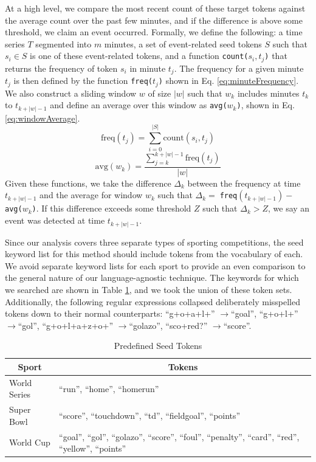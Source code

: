 \documentclass{sig-alternate}
\begin{document}
At a high level, we compare the most recent count of these target tokens against the average count over the past few minutes, and if the difference is above some threshold, we claim an event occurred.
Formally, we define the following: a time series $T$ segmented into $m$ minutes, a set of event-related seed tokens $S$ such that $s_i \in S$ is one of these event-related tokens, and a function \texttt{count($s_i, t_j$)} that returns the frequency of token $s_i$ in minute $t_j$.
The frequency for a given minute $t_j$ is then defined by the function \texttt{freq($t_j$)} shown in Eq. \ref{eq:minuteFrequency}.
We also construct a sliding window $w$ of size $|w|$ such that $w_k$ includes minutes $t_k$ to $t_{k+|w|-1}$ and define an average over this window as \texttt{avg($w_k$)}, shown in Eq. \ref{eq:windowAverage}.
%
\begin{equation}
\label{eq:minuteFrequency}
\text{freq}(t_j) = \sum_{i=0}^{|S|}\text{count}(s_i, t_j)
\end{equation}
\begin{equation}
\label{eq:windowAverage}
\text{avg}(w_k) = \frac{\sum_{j=k}^{k + |w| - 1}\text{freq}(t_j)}{|w|}
\end{equation}
%
Given these functions, we take the difference $\Delta_k$ between the frequency at time $t_{k+|w|-1}$ and the average for window $w_k$ such that $\Delta_k = \;$\texttt{freq}$(t_{k+|w|-1}) - $ \texttt{avg($w_k$)}.
If this difference exceeds some threshold $Z$ such that $\Delta_k > Z$, we say an event was detected at time $t_{k+|w|-1}$.

Since our analysis covers three separate types of sporting competitions, the seed keyword list for this method should include tokens from the vocabulary of each. 
We avoid separate keyword lists for each sport to provide an even comparison to the general nature of our language-agnostic technique.
The keywords for which we searched are shown in Table \ref{tab:targetTokens}, and we took the union of these token sets.
Additionally, the following regular expressions collapsed deliberately misspelled tokens down to their normal counterparts: ``g+o+a+l+'' $\rightarrow$``goal'', ``g+o+l+'' $\rightarrow$``gol'', ``g+o+l+a+z+o+'' $\rightarrow$``golazo'', ``sco+red?'' $\rightarrow$``score''.

%
\begin{table}[htdp]
\caption{Predefined Seed Tokens}
\begin{center}
\begin{tabular}{|p{0.7in}|p{2.0in}|}
\hline
\multicolumn{1}{|c|}{\textbf{Sport}} & \multicolumn{1}{|c|}{\textbf{Tokens}} \\ \hline
World Series & ``run'', ``home'', ``homerun'' \\ \hline
Super Bowl & ``score'', ``touchdown'', ``td'', ``fieldgoal'', ``points'' \\ \hline
World Cup & ``goal'', ``gol'', ``golazo'', ``score'', ``foul'', ``penalty'', ``card'', ``red'', ``yellow'', ``points'' \\ \hline
\end{tabular}
\end{center}
\label{tab:targetTokens}
\end{table}
\end{document}
